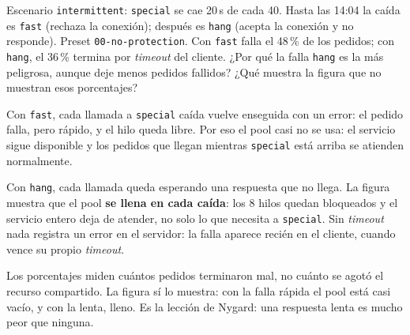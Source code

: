 \documentclass[variant=guia,cover=institutional,mode=screen]{ua-engineering-v6-article}
\begin{document}
\begin{uaexercise}
Escenario \texttt{intermittent}: \texttt{special} se cae 20\,s de cada 40. Hasta las 14:04 la caída es \texttt{fast} (rechaza la conexión); después es \texttt{hang} (acepta la conexión y no responde). Preset \texttt{00-no-protection}. Con \texttt{fast} falla el 48\,\% de los pedidos; con \texttt{hang}, el 36\,\% termina por \emph{timeout} del cliente.
¿Por qué la falla \texttt{hang} es la más peligrosa, aunque deje menos pedidos fallidos? ¿Qué muestra la figura que no muestran esos porcentajes?
\end{uaexercise}
\begin{uaanswer}
Con \texttt{fast}, cada llamada a \texttt{special} caída vuelve enseguida con un error: el pedido falla, pero rápido, y el hilo queda libre. Por eso el pool casi no se usa: el servicio sigue disponible y los pedidos que llegan mientras \texttt{special} está arriba se atienden normalmente.

Con \texttt{hang}, cada llamada queda esperando una respuesta que no llega. La figura muestra que el pool \textbf{se llena en cada caída}: los 8 hilos quedan bloqueados y el servicio entero deja de atender, no solo lo que necesita a \texttt{special}. Sin \emph{timeout} nada registra un error en el servidor: la falla aparece recién en el cliente, cuando vence su propio \emph{timeout}.

Los porcentajes miden cuántos pedidos terminaron mal, no cuánto se agotó el recurso compartido. La figura sí lo muestra: con la falla rápida el pool está casi vacío, y con la lenta, lleno. Es la lección de Nygard: una respuesta lenta es mucho peor que ninguna.
\end{uaanswer}
\end{document}
